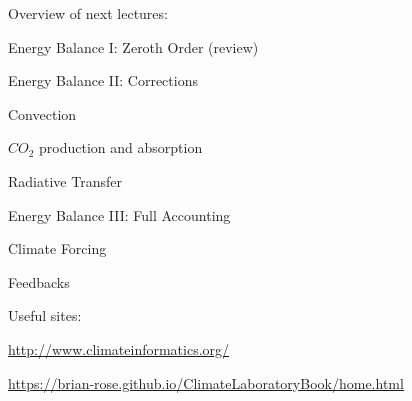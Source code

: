 \documentclass[11pt]{book}
\begin{document}



Overview of next lectures:
\bei
\item  Energy Balance I: Zeroth Order (review)
\item Energy Balance II: Corrections
\item Convection
\item $CO_2$ production and absorption 
\item Radiative Transfer
\item Energy Balance III: Full Accounting
\item Climate Forcing
\item Feedbacks
\eei

Useful sites:
\bee
\item\href{Cimateinfomatics}{http://www.climateinformatics.org/}
\item\href{The Climate Laboratory}{https://brian-rose.github.io/ClimateLaboratoryBook/home.html}
\eee
\end{document}
